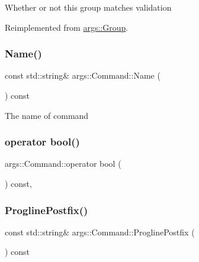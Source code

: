 Whether or not this group matches validation 

Reimplemented from \hyperlink{classargs_1_1_group_a7794d31edae97254be440b8768db9af0}{args\+::\+Group}.

\mbox{\label{classargs_1_1_command_a98724f5317b07197721807ab40ca8eae}} 
\subsubsection{\texorpdfstring{Name()}{Name()}}
{\footnotesize\ttfamily const std\+::string\& args\+::\+Command\+::\+Name (\begin{DoxyParamCaption}{ }\end{DoxyParamCaption}) const\hspace{0.3cm}{\ttfamily [inline]}}

The name of command \mbox{\label{classargs_1_1_command_a31dfb353bcab4047be1dee1d915dbc8f}} 
\subsubsection{\texorpdfstring{operator bool()}{operator bool()}}
{\footnotesize\ttfamily args\+::\+Command\+::operator bool (\begin{DoxyParamCaption}{ }\end{DoxyParamCaption}) const\hspace{0.3cm}{\ttfamily [inline]}, {\ttfamily [noexcept]}}

\mbox{\label{classargs_1_1_command_a19e418cd5e8ad19f168c9e0eb6216775}} 
\subsubsection{\texorpdfstring{Progline\+Postfix()}{ProglinePostfix()}\hspace{0.1cm}{\footnotesize\ttfamily [1/2]}}
{\footnotesize\ttfamily const std\+::string\& args\+::\+Command\+::\+Progline\+Postfix (\begin{DoxyParamCaption}{ }\end{DoxyParamCaption}) const\hspace{0.3cm}{\ttfamily [inline]}}

